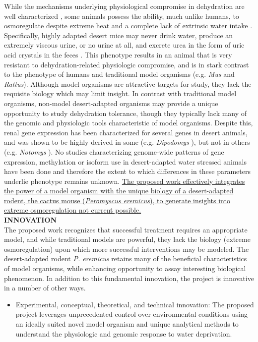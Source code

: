 \noindent While the mechanisms underlying physiological compromise in dehydration are well characterized \citep{Roberts:2010fl}, some animals possess the ability, much unlike humans, to osmoregulate despite extreme heat and a complete lack of extrinsic water intake \citep{NAGY:1994ta}. Specifically, highly adapted desert mice may never drink water, produce an extremely viscous urine, or no urine at all, and excrete urea in the form of uric acid crystals in the feces \citep{SCHMIDTNIELSEN:1952wi}. This phenotype results in an animal that is very resistant to dehydration-related physiologic compromise, and is in stark contrast to the phenotype of humans and traditional model organisms (e.g. \textit{Mus} and \textit{Rattus}). Although model organisms are attractive targets for study, they lack the requisite biology which may limit insight. In contrast with traditional model organisms, non-model desert-adapted organisms may provide a unique opportunity to study dehydration tolerance, though they typically lack many of the genomic and physiologic tools characteristic of model organisms. Despite this, renal gene expression has been characterized for several genes in desert animals, and was shown to be highly derived in some (e.g. \textit{Dipodomys} \citep{Huang:2001ti}), but not in others (e.g. \textit{Notomys} \cite{Weaver:1994wv}). No studies characterizing genome-wide patterns of gene expression, methylation or isoform use in desert-adapted water stressed animals have been done and therefore the extent to which differences in these parameters underlie phenotype remains unknown. \ul{The proposed work effectively integrates the power of a model organism with the unique biology of a desert-adapted rodent, the cactus mouse (\textit{Peromyscus eremicus}), to generate insights into extreme osmoregulation not current possible.} \\


\noindent \textbf{INNOVATION} \\


\noindent The proposed work recognizes that successful treatment requires an appropriate model, and while traditional models are powerful, they lack the biology (extreme osmoregulation) upon which more successful interventions may be modeled. The desert-adapted rodent \textit{P. eremicus} retains many of the beneficial characteristics of model organisms, while enhancing opportunity to assay interesting biological phenomenon. In addition to this fundamental innovation, the project is innovative in a number of other ways.
\begin{itemize}
\item Experimental, conceptual, theoretical, and technical innovation: The proposed project leverages unprecedented control over environmental conditions using an ideally suited novel model organism and unique analytical methods to understand the physiologic and genomic response to water deprivation.

\end{itemize}



%
